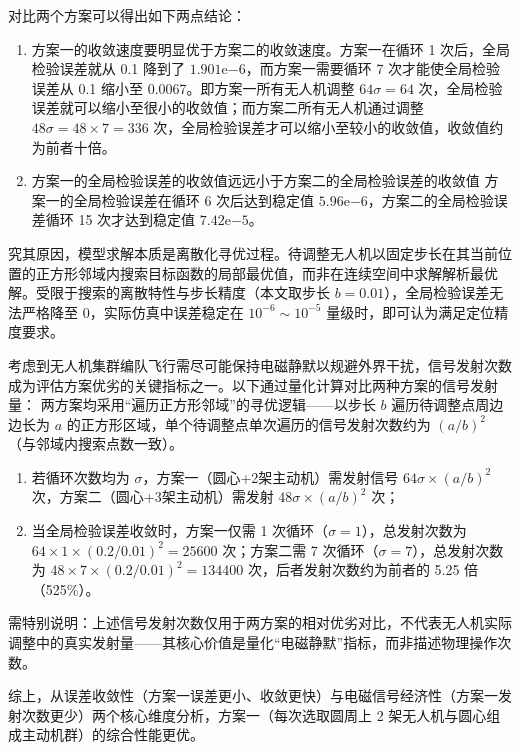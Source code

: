 \documentclass[withoutpreface,bwprint]{cumcmthesis} %
\begin{document}
对比两个方案可以得出如下两点结论：

\begin{enumerate}
    \item 方案一的收敛速度要明显优于方案二的收敛速度。方案一在循环 1 次后，全局检验误差就从 0.1 降到了 $1.901\mathrm{e}{-6}$，而方案一需要循环 7 次才能使全局检验误差从 0.1 缩小至 0.0067。即方案一所有无人机调整 $64\sigma = 64$ 次，全局检验误差就可以缩小至很小的收敛值；而方案二所有无人机通过调整 $48\sigma = 48 \times 7 = 336$ 次，全局检验误差才可以缩小至较小的收敛值，收敛值约为前者十倍。

    \item 方案一的全局检验误差的收敛值远远小于方案二的全局检验误差的收敛值
方案一的全局检验误差在循环 6 次后达到稳定值 $5.96\mathrm{e}{-6}$，方案二的全局检验误差循环 15 次才达到稳定值 $7.42\mathrm{e}{-5}$。
\end{enumerate}


究其原因，模型求解本质是离散化寻优过程。待调整无人机以固定步长在其当前位置的正方形邻域内搜索目标函数的局部最优值，而非在连续空间中求解解析最优解。受限于搜索的离散特性与步长精度（本文取步长 \( b = 0.01 \)），全局检验误差无法严格降至 0，实际仿真中误差稳定在 \( 10^{-6} \sim 10^{-5} \) 量级时，即可认为满足定位精度要求。


考虑到无人机集群编队飞行需尽可能保持电磁静默以规避外界干扰，信号发射次数成为评估方案优劣的关键指标之一。以下通过量化计算对比两种方案的信号发射量：  
两方案均采用“遍历正方形邻域”的寻优逻辑——以步长 \( b \) 遍历待调整点周边边长为 \( a \) 的正方形区域，单个待调整点单次遍历的信号发射次数约为 \( (a/b)^2 \)（与邻域内搜索点数一致）。  
\begin{enumerate}
    \item 若循环次数均为 \( \sigma \)，方案一（圆心+2架主动机）需发射信号 \( 64\sigma \times (a/b)^2 \) 次，方案二（圆心+3架主动机）需发射 \( 48\sigma \times (a/b)^2 \) 次；
    \item 当全局检验误差收敛时，方案一仅需 1 次循环（\( \sigma = 1 \)），总发射次数为 \( 64 \times 1 \times (0.2/0.01)^2 = 25600 \) 次；方案二需 7 次循环（\( \sigma = 7 \)），总发射次数为 \( 48 \times 7 \times (0.2/0.01)^2 = 134400 \) 次，后者发射次数约为前者的 5.25 倍（525\%）。  
\end{enumerate}

需特别说明：上述信号发射次数仅用于两方案的相对优劣对比，不代表无人机实际调整中的真实发射量——其核心价值是量化“电磁静默”指标，而非描述物理操作次数。

综上，从误差收敛性（方案一误差更小、收敛更快）与电磁信号经济性（方案一发射次数更少）两个核心维度分析，方案一（每次选取圆周上 2 架无人机与圆心组成主动机群）的综合性能更优。  
\end{document}
